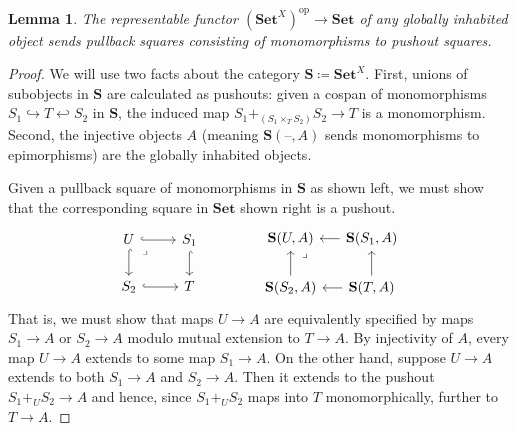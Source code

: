 \documentclass[11pt, oneside, article]{memoir}
\theoremstyle{plain}
\newtheorem{lemma}[theorem]{Lemma}
\theoremstyle{definition}
\theoremstyle{remark}
\DeclareMathOperator{\ophelper}{op}
\newcommand{\dash}{{\mathord{\text{--}}}}
\newcommand{\op}{^{\ophelper}}
\newcommand{\namedcat}[1]{\mathbf{#1}}
\newcommand{\cat}[1]{\mathbf{#1}}
\newcommand{\Set}{\namedcat{Set}}
\newcommand{\Ho}[1]{#1}
\newcommand{\xA}{A}
\newcommand{\xS}{S}
\newcommand{\xT}{T}
\newcommand{\xU}{U}
\newcommand{\xX}{X}
\newcommand{\bS}{\cat{S}}
\begin{document}
\begin{lemma}\label{lem:surjcorefl}
  The representable functor $(\Set^\xX)\op \to \Set$ of any globally
  inhabited object sends pullback squares consisting of monomorphisms
  to pushout squares.
\end{lemma}
\begin{proof}
  We will use two facts about the category $\bS \coloneqq
  \Set^\xX$. First, unions of subobjects in $\bS$ are calculated as
  pushouts: given a cospan of monomorphisms
  $\xS_1 \hookrightarrow \xT \hookleftarrow \xS_2$ in $\bS$, the induced map
  $\xS_1 +_{(\xS_1 \times_{\xT} \xS_2)} \xS_2 \to \xT$ is a monomorphism.
  Second, the injective objects $\xA$ (meaning $\Ho{\bS}(\dash, \xA)$ sends
  monomorphisms to epimorphisms) are the globally inhabited objects.
  
  Given a pullback square of monomorphisms in $\bS$ as shown left, we
  must show that the corresponding square in $\Set$ shown right is a
  pushout.
  \[\begin{tikzcd}
      \xU & {\xS_1} \\
      {\xS_2} & \xT
      \arrow[hook, from=1-1, to=1-2]
      \arrow[hook, from=1-1, to=2-1]
      \arrow["\lrcorner"{anchor=center, pos=0.125}, draw=none, from=1-1, to=2-2]
      \arrow[hook, from=1-2, to=2-2]
      \arrow[hook, from=2-1, to=2-2]
    \end{tikzcd}
    \qquad\qquad
    \begin{tikzcd}[column sep=12.5]
      {\Ho{\bS}(\xU, \xA)} & {\Ho{\bS}(\xS_1, \xA)} \\
      {\Ho{\bS}(\xS_2, \xA)} & {\Ho{\bS}(\xT, \xA)}
      \arrow[from=1-2, to=1-1]
      \arrow[from=2-1, to=1-1]
      \arrow[from=2-2, to=1-2]
      \arrow[""{name=0, anchor=center, inner sep=0}, from=2-2, to=2-1]
      \arrow["\lrcorner"{anchor=center, pos=0.125}, draw=none, from=1-1, to=0]
    \end{tikzcd}\] That is, we must show that maps $\xU \to \xA$ are
  equivalently specified by maps $\xS_1 \to \xA$ or $\xS_2 \to \xA$ modulo
  mutual extension to $\xT \to \xA$. By injectivity of $\xA$, every map
  $\xU \to \xA$ extends to some map $\xS_1 \to \xA$.
  On the other hand, suppose $\xU \to \xA$ extends to both $\xS_1 \to \xA$ and
  $\xS_2 \to \xA$. Then it extends to the pushout $\xS_1 +_\xU \xS_2 \to \xA$ and
  hence, since $\xS_1 +_\xU \xS_2$ maps into $\xT$ monomorphically, further to
  $\xT \to \xA$.
\end{proof}
\end{document}
